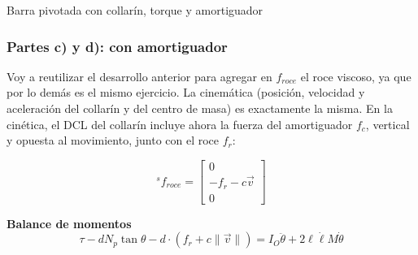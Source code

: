 \begin{solucion}{Barra pivotada con collarín, torque y amortiguador}
\subsubsection*{Partes c) y d): con amortiguador}

Voy a reutilizar el desarrollo anterior para agregar en $f_{roce}$ el roce viscoso, ya que por lo demás es el mismo ejercicio. La cinemática (posición, velocidad y aceleración del collarín y del centro de masa) es exactamente la misma. En la cinética, el DCL del collarín incluye ahora la fuerza del amortiguador $f_c$, vertical y opuesta al movimiento, junto con el roce $f_r$:

\begin{center}
\end{center}

$$
{}^s f_{roce} = \begin{bmatrix} 0 \\ -f_r-c\vec{v} \\ 0 \end{bmatrix}
$$

\textbf{Balance de momentos}
$$\tau - d N_p \tan \theta - d\cdot (f_r+c\|\vec{v}\|) = I_{O} \ddot{\theta}+2\ell\dot\ell M\dot\theta$$

\end{solucion}
